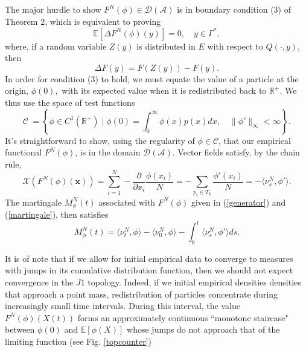  
The major hurdle to show $F^N(\phi) \in \mathcal D(\mathcal A)$ is in  boundary condition (3) of Theorem 2, which is equivalent to proving 
\begin{equation}
\mathbb{E}\left[\Delta F^N(\phi)(y)\right] = 0, \quad y \in \Gamma^*,
\end{equation}
where, if a random variable $Z(y)$ is distributed in $E$ with respect to $Q(\cdot,y)$, then  
\begin{equation}
\Delta F(y) = F(Z(y))-F(y).
\end{equation}
In order for  condition (3) to hold, we must equate the value of a particle at the origin,  $\phi(0),$ with its expected value when it is redistributed back to $\mathbb R^+$. We thus use the space of test functions  
\begin{equation}
\mathcal  C  \ = \left\{\phi \in C^1(\mathbb{R}^+) \mid \phi(0) = \int_0^\infty \phi(x)p(x)dx, \quad \|\phi'\|_\infty<\infty \right\} . \end{equation}
It's straightforward to show, using the regularity of $\phi \in \mathcal C$, that our empirical functional $F^N(\phi)$,  is  in the domain $\mathcal D(\mathcal A)$. Vector fields satisfy, by the chain rule,
\begin{equation}
\mathcal X(F^{N}(\phi)(\mathbf x)) = \sum_{i = 1}^{N}-\frac{\partial}{\partial x_i}\frac{\phi(x_i)}{N} = -\sum_{p_i \in T_k} \frac{\phi'(x_i)}{N} 
 = -\langle \nu_s^N, \phi'  \rangle. 
\end{equation}
   The martingale $M_\phi^N(t)$ associated with $F^N(\phi)$ given in (\ref{generator}) and (\ref{martingale}),   then satisfies 
\begin{equation}\label{marty}
M^N_\phi(t) = \langle \nu_t^N,\phi \rangle- \langle \nu_0^N,\phi \rangle- \int_0^t \langle \nu_s^N,\phi' \rangle ds . 
\end{equation}



   


It is of note that if we allow for initial empirical data to converge to measures with jumps in its cumulative distribution function, then we should not expect convergence in the $J1$ topology. Indeed, if we initial empirical densities densities that approach a point mass,  redistribution of particles concentrate during increasingly small time intervals. During this interval, the value $F^{N}(\phi)(X(t))$ forms an approximately continuous ``monotone staircase" between $\phi(0)$ and $\mathbb{E}[\phi(X)]$ whose jumps do not approach that of the limiting function (see Fig. \ref{topcounter})

